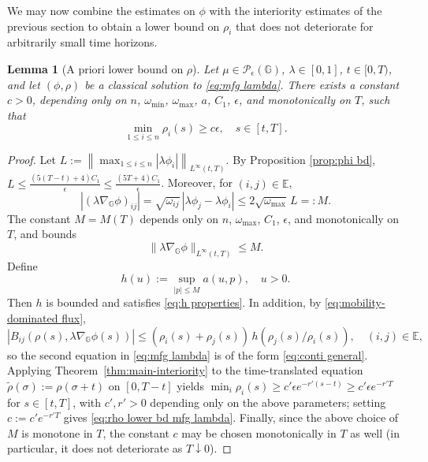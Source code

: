 \documentclass[10pt]{article}
\newtheorem{lemma}[theorem]{Lemma}
\newtheorem{corollary}[theorem]{Corollary}
\numberwithin{equation}{section}
\newcommand{\cP}{ \mathcal{P}}
\newcommand{\bE}{\mathbb E}
\def\G{\mathbb{G}}
\begin{document}
We may now combine the estimates on $\phi$ with the interiority estimates of the previous section to obtain a lower bound on $\rho_i$ that does not deteriorate for arbitrarily small time horizons.
\begin{lemma}[A priori lower bound on $\rho$]\label{lem:rho lower bound mfg lambda}
Let $\mu \in \cP_\epsilon(\G)$, $\lambda\in[0,1]$, $t\in[0,T)$, and let $(\phi,\rho)$ be a classical solution to \eqref{eq:mfg lambda}. There exists a constant $c>0$, depending only on $n$, $\omega_{\min}$, $\omega_{\max}$, $a$, $C_1$, $\epsilon$, and monotonically on $T$, such that
\begin{equation}\label{eq:rho lower bd mfg lambda}
    \min_{1\leq i\leq n} \rho_i(s)\geq c\epsilon, \quad s\in[t,T].
\end{equation}
\end{lemma}
\begin{proof}
Let $L:=\left\|\max_{1\leq i\leq n}|\lambda\phi_i|\right\|_{L^{\infty}(t,T)}$. By Proposition \ref{prop:phi bd}, $L\leq \frac{(5(T-t)+4)C_1}{\epsilon}\leq \frac{(5T+4)C_1}{\epsilon}$. Moreover, for $(i,j)\in \bE$,
\[
|(\lambda\nabla_{\G}\phi)_{ij}|=\sqrt{\omega_{ij}}\,|\lambda\phi_j-\lambda\phi_i|
\leq 2\sqrt{\omega_{\max}}\,L=:M.
\]
The constant $M = M(T)$ depends only on $n$, $\omega_{\max}$, $C_1$, $\epsilon$, and monotonically on $T$, and bounds
\[
\|\lambda\nabla_{\G}\phi\|_{L^{\infty}(t,T)}\leq M.
\]
Define
\[
h(u):=\sup_{|p|\leq M}a(u,p), \quad u>0.
\]
Then $h$ is bounded and satisfies \eqref{eq:h properties}. In addition, by \eqref{eq:mobility-dominated flux},
\[
|B_{ij}(\rho(s),\lambda\nabla_{\G}\phi(s))|
\leq (\rho_i(s)+\rho_j(s))\,h(\rho_j(s)/\rho_i(s)), \quad (i,j)\in \bE,
\]
so the second equation in \eqref{eq:mfg lambda} is of the form \eqref{eq:conti general}. Applying Theorem~\ref{thm:main-interiority} to the time-translated equation $\tilde\rho(\sigma):=\rho(\sigma+t)$ on $[0,T-t]$ yields $\min_{i}\rho_i(s)\geq c'\epsilon e^{-r'(s-t)}\geq c'\epsilon e^{-r'T}$ for $s\in[t,T]$, with $c',r'>0$ depending only on the above parameters; setting $c:=c'e^{-r'T}$ gives \eqref{eq:rho lower bd mfg lambda}. Finally, since the above choice of $M$ is monotone in $T$, the constant $c$ may be chosen monotonically in $T$ as well (in particular, it does not deteriorate as $T\downarrow 0$).
\end{proof}
%
\end{document}
